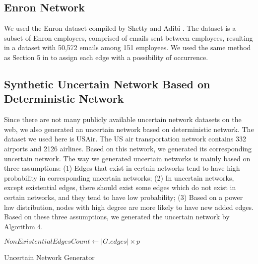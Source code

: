 \documentclass[\main/thesis.tex]{subfiles}
\begin{document}
\subsection*{Enron Network}
We used the Enron dataset compiled by Shetty and Adibi \cite{shetty2004enron}. The dataset is a subset of Enron employees, comprised of emails sent between employees, resulting in a dataset with 50,572 emails among 151 employees. We used the same method as Section 5 in  \cite{pfeiffer2010probabilistic} to assign each edge with a possibility of occurrence. 

\subsection*{Synthetic Uncertain Network Based on Deterministic Network}
Since there are not many publicly available uncertain network datasets on the web, we also generated an uncertain network based on deterministic network. The dataset we used here is USAir. The US air transportation network contains 332 airports and 2126 airlines. Based on this network, we generated its corresponding uncertain network. The way we generated uncertain networks is mainly based on three assumptions: (1) Edges that exist in certain networks tend to have high probability in corresponding uncertain networks; (2) In uncertain networks, except existential edges, there should exist some edges which do not exist in certain networks, and they tend to have low probability; (3) Based on a power law distribution, nodes with high degree are more likely to have new added edges. Based on these three assumptions, we generated the uncertain network by Algorithm 4.
\begin{algorithm}
  \For{each edge $e \in G.edges$}{
        Generate probability $P$ according to a Gaussian distribution with mean 0.8 and variance 1. (If not in the range (0,1], regenerate it.)\;
        Assign probability $P$ to edge $e$\;
    }
$NonExistentialEdgesCount\leftarrow|G.edges|\times p$\;
\While{$NonExistentialEdgesCount>0$}{
    Generate edge $e$ which is not in $G.edges$\;
    Generate probability $P$ according to a Gaussian distribution with mean 0.2 and variance 1. (If not in the range (0,1], regenerate it.)\;
    Assign probability $P$ to edge $e$\;
    $NonExistentialEdgesCount \leftarrow NonExistentialEdgesCount-1$\;
}
\caption{Uncertain Network Generator}
\end{algorithm}
\end{document}
